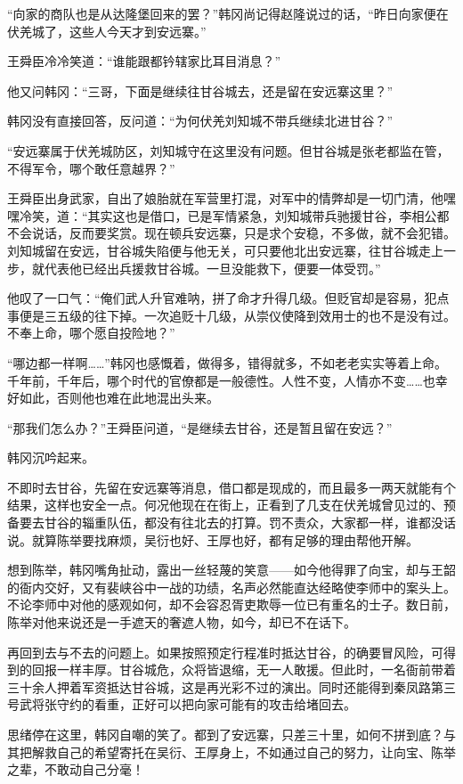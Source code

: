 “向家的商队也是从达隆堡回来的罢？”韩冈尚记得赵隆说过的话，“昨日向家便在伏羌城了，这些人今天才到安远寨。”

王舜臣冷冷笑道：“谁能跟都钤辖家比耳目消息？”

他又问韩冈：“三哥，下面是继续往甘谷城去，还是留在安远寨这里？”

韩冈没有直接回答，反问道：“为何伏羌刘知城不带兵继续北进甘谷？”

“安远寨属于伏羌城防区，刘知城守在这里没有问题。但甘谷城是张老都监在管，不得军令，哪个敢任意越界？”

王舜臣出身武家，自出了娘胎就在军营里打混，对军中的情弊却是一切门清，他嘿嘿冷笑，道：“其实这也是借口，已是军情紧急，刘知城带兵驰援甘谷，李相公都不会说话，反而要奖赏。现在顿兵安远寨，只是求个安稳，不多做，就不会犯错。刘知城留在安远，甘谷城失陷便与他无关，可只要他北出安远寨，往甘谷城走上一步，就代表他已经出兵援救甘谷城。一旦没能救下，便要一体受罚。”

他叹了一口气：“俺们武人升官难呐，拼了命才升得几级。但贬官却是容易，犯点事便是三五级的往下掉。一次追贬十几级，从崇仪使降到效用士的也不是没有过。不奉上命，哪个愿自投险地？”

“哪边都一样啊……”韩冈也感慨着，做得多，错得就多，不如老老实实等着上命。千年前，千年后，哪个时代的官僚都是一般德性。人性不变，人情亦不变……也幸好如此，否则他也难在此地混出头来。

“那我们怎么办？”王舜臣问道，“是继续去甘谷，还是暂且留在安远？”

韩冈沉吟起来。

不即时去甘谷，先留在安远寨等消息，借口都是现成的，而且最多一两天就能有个结果，这样也安全一点。何况他现在在街上，正看到了几支在伏羌城曾见过的、预备要去甘谷的辎重队伍，都没有往北去的打算。罚不责众，大家都一样，谁都没话说。就算陈举要找麻烦，吴衍也好、王厚也好，都有足够的理由帮他开解。

想到陈举，韩冈嘴角扯动，露出一丝轻蔑的笑意——如今他得罪了向宝，却与王韶的衙内交好，又有裴峡谷中一战的功绩，名声必然能直达经略使李师中的案头上。不论李师中对他的感观如何，却不会容忍胥吏欺辱一位已有重名的士子。数日前，陈举对他来说还是一手遮天的奢遮人物，如今，却已不在话下。

再回到去与不去的问题上。如果按照预定行程准时抵达甘谷，的确要冒风险，可得到的回报一样丰厚。甘谷城危，众将皆退缩，无一人敢援。但此时，一名衙前带着三十余人押着军资抵达甘谷城，这是再光彩不过的演出。同时还能得到秦凤路第三号武将张守约的看重，正好可以把向家可能有的攻击给堵回去。

思绪停在这里，韩冈自嘲的笑了。都到了安远寨，只差三十里，如何不拼到底？与其把解救自己的希望寄托在吴衍、王厚身上，不如通过自己的努力，让向宝、陈举之辈，不敢动自己分毫！


